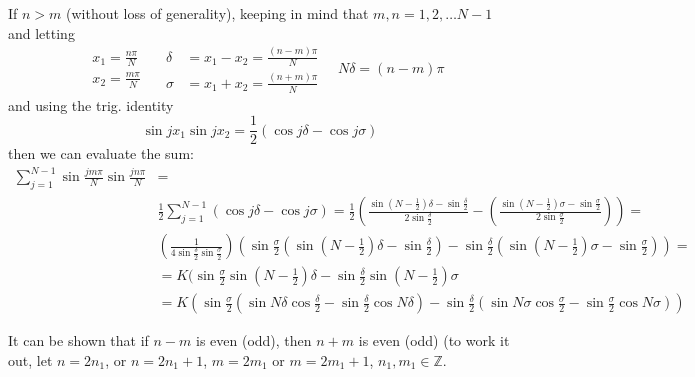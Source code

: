 \documentclass[twoside,10pt]{amsart}
\begin{document}
If $n>m$ (without loss of generality), keeping in mind that $m,n = 1,2, \dots N-1$ and letting
\[
\begin{aligned}
& x_1 = \frac{ n \pi }{ N }  \\
& x_2 = \frac{ m \pi }{ N } 
\end{aligned}
\quad 
\begin{aligned}
\delta & = x_1 -x_2 = \frac{ (n-m) \pi }{ N} \\
\sigma & = x_1 +x_2 = \frac{ (n+m) \pi }{ N} 
\end{aligned}
\quad N \delta = (n-m)\pi
\]
and using the trig. identity
\[
\sin{ jx_1} \sin{ j x_2} = \frac{1}{2} ( \cos{ j\delta } - \cos{ j \sigma} )
\]
then we can evaluate the sum:
\[
\begin{aligned}
  \sum_{j=1}^{N-1} \sin{ \frac{ jm \pi}{ N}} \sin{ \frac{ j n \pi }{ N} } & = \\
  & \frac{1}{2} \sum_{j=1}^{N-1} (\cos{ j\delta } - \cos{ j \sigma} ) = \frac{1}{2} \left( \frac{ \sin{ (N-\frac{1}{2} )\delta } - \sin{  \frac{\delta}{2} } }{ 2 \sin{ \frac{ \delta}{2} } } -  \left( \frac{ \sin{ (N-\frac{1}{2} )\sigma } - \sin{ \frac{\sigma}{2} } }{ 2 \sin{ \frac{ \sigma}{2} } } \right) \right) = \\
  & \left( \frac{1}{ 4 \sin{ \frac{\delta}{2} } \sin{ \frac{ \sigma}{2} } } \right) \left( \sin{ \frac{ \sigma}{2} } ( \sin{ (N-\frac{1}{2} ) \delta } - \sin{ \frac{ \delta}{2} } ) -  \sin{ \frac{ \delta }{2}} ( \sin{ (N-\frac{1}{2} ) \sigma } - \sin{ \frac{ \sigma }{2} } ) \right) = \\
  & = K ( \sin{ \frac{\sigma}{2} } \sin{ (N-\frac{1}{2} ) \delta }  -  \sin{ \frac{\delta}{2} } \sin{ (N-\frac{1}{2} ) \sigma }   \\
  & = K ( \sin{ \frac{\sigma}{2} } ( \sin{ N \delta} \cos{ \frac{\delta}{2} } - \sin{ \frac{\delta}{2}} \cos{ N \delta} ) -  \sin{ \frac{\delta}{2} } ( \sin{ N \sigma} \cos{ \frac{\sigma}{2} } - \sin{ \frac{\sigma}{2}} \cos{ N \sigma} ) ) 
\end{aligned}
\]

It can be shown that if $n-m$ is even (odd), then $n+m$ is even (odd) (to work it out, let $n=2n_1$, or $n=2n_1+1$, $m=2m_1$ or $m=2m_1 + 1$, $n_1,m_1 \in \mathbb{Z}$.
\end{document}
